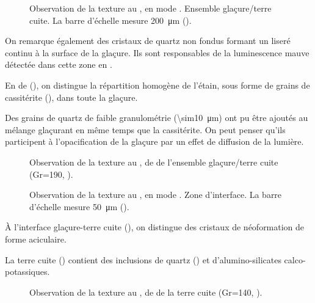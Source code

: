 \begin{figure}[htb]
  \caption{\legendeE 
           Observation de la texture au \MEB, en mode \ERD. 
           Ensemble glaçure/terre cuite. La barre d'échelle mesure 
           \SI{200}{\um} ().}
  \label{MEB:6532_img}
\end{figure}

On remarque également des cristaux de quartz non fondus formant un liseré continu à la surface de la glaçure. Ils sont responsables de la luminescence mauve détectée dans cette zone en \CL.

En \carto de \RX (), on distingue la répartition homogène de l'étain, sous forme de grains de cassitérite (), dans toute la glaçure.

Des grains de quartz de faible granulométrie (\SI{\sim10}{\um}) ont pu être ajoutés au mélange glaçurant en même temps que la cassitérite. On peut penser qu'ils participent à l'opacification de la glaçure par un effet de diffusion de la lumière.

\begin{figure}[htb]
  \caption{\legendeE 
           Observation de la texture au \MEB, \carto de \RX de l'ensemble glaçure/terre cuite (Gr=190, ).}
  \label{MEB:6532_carto_tcgla}
\end{figure}

\begin{figure}[htb]
  \caption{\legendeE 
           Observation de la texture au \MEB, en mode \ERD. 
           Zone d'interface. La barre d'échelle mesure \SI{50}{\um} 
           ().}
  \label{MEB:6532_img_int}
\end{figure}

À l'interface glaçure-terre cuite (), on 
distingue des cristaux de néoformation de forme aciculaire.

La terre cuite () contient des inclusions de 
quartz () et d'alumino-silicates calco-potassiques.

\begin{figure}[htb]
  \caption{\legendeE 
           Observation de la texture au \MEB, \carto de \RX de la terre cuite (Gr=140, ).}
  \label{MEB:6532_carto_tc}
\end{figure}



